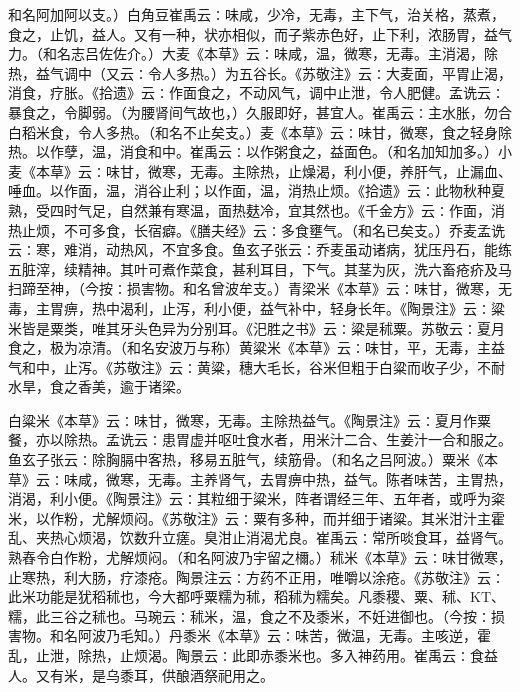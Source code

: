 \documentclass[a4paper,12pt,UTF8,twoside]{ctexbook}
\begin{document}
和名阿加阿以支。）白角豆崔禹云∶味咸，少冷，无毒，主下气，治关格，蒸煮，食之，止饥，益人。又有一种，状亦相似，而子紫赤色好，止下利，浓肠胃，益气力。（和名志吕佐佐介。）大麦《本草》云∶味咸，温，微寒，无毒。主消渴，除热，益气调中（又云∶令人多热。）为五谷长。《苏敬注》云∶大麦面，平胃止渴，消食，疗胀。《拾遗》云∶作面食之，不动风气，调中止泄，令人肥健。孟诜云∶暴食之，令脚弱。（为腰肾间气故也，）久服即好，甚宜人。崔禹云∶主水胀，勿合白稻米食，令人多热。（和名不止矣支。）麦《本草》云∶味甘，微寒，食之轻身除热。以作孽，温，消食和中。崔禹云∶以作粥食之，益面色。（和名加知加多。）小麦《本草》云∶味甘，微寒，无毒。主除热，止燥渴，利小便，养肝气，止漏血、唾血。以作面，温，消谷止利；以作面，温，消热止烦。《拾遗》云∶此物秋种夏熟，受四时气足，自然兼有寒温，面热麸冷，宜其然也。《千金方》云∶作面，消热止烦，不可多食，长宿癖。《膳夫经》云∶多食壅气。（和名已矣支。）乔麦孟诜云∶寒，难消，动热风，不宜多食。鱼玄子张云∶乔麦虽动诸病，犹压丹石，能练五脏滓，续精神。其叶可煮作菜食，甚利耳目，下气。其茎为灰，洗六畜疮疥及马扫蹄至神，（今按∶损害物。和名曾波牟支。）青梁米《本草》云∶味甘，微寒，无毒，主胃痹，热中渴利，止泻，利小便，益气补中，轻身长年。《陶景注》云∶粱米皆是粟类，唯其牙头色异为分别耳。《汜胜之书》云∶粱是秫粟。苏敬云∶夏月食之，极为凉清。（和名安波万与称）黄粱米《本草》云∶味甘，平，无毒，主益气和中，止泻。《苏敬注》云∶黄粱，穗大毛长，谷米但粗于白粱而收子少，不耐水旱，食之香美，逾于诸梁。

白粱米《本草》云∶味甘，微寒，无毒。主除热益气。《陶景注》云∶夏月作粟餐，亦以除热。孟诜云∶患胃虚并呕吐食水者，用米汁二合、生姜汁一合和服之。鱼玄子张云∶除胸膈中客热，移易五脏气，续筋骨。（和名之吕阿波。）粟米《本草》云∶味咸，微寒，无毒。主养肾气，去胃痹中热，益气。陈者味苦，主胃热，消渴，利小便。《陶景注》云∶其粒细于粱米，阵者谓经三年、五年者，或呼为粢米，以作粉，尤解烦闷。《苏敬注》云∶粟有多种，而并细于诸粱。其米泔汁主霍乱、夹热心烦渴，饮数升立瘥。臭泔止消渴尤良。崔禹云∶常所啖食耳，益肾气。熟舂令白作粉，尤解烦闷。（和名阿波乃宇留之檷。）秫米《本草》云∶味甘微寒，止寒热，利大肠，疗漆疮。陶景注云∶方药不正用，唯嚼以涂疮。《苏敬注》云∶此米功能是犹稻秫也，今大都呼粟糯为秫，稻秫为糯矣。凡黍稷、粟、秫、KT、糯，此三谷之秫也。马琬云∶秫米，温，食之不及黍米，不妊进御也。（今按∶损害物。和名阿波乃毛知。）丹黍米《本草》云∶味苦，微温，无毒。主咳逆，霍乱，止泄，除热，止烦渴。陶景云∶此即赤黍米也。多入神药用。崔禹云∶食益人。又有米，是乌黍耳，供酿酒祭祀用之。
\end{document}
